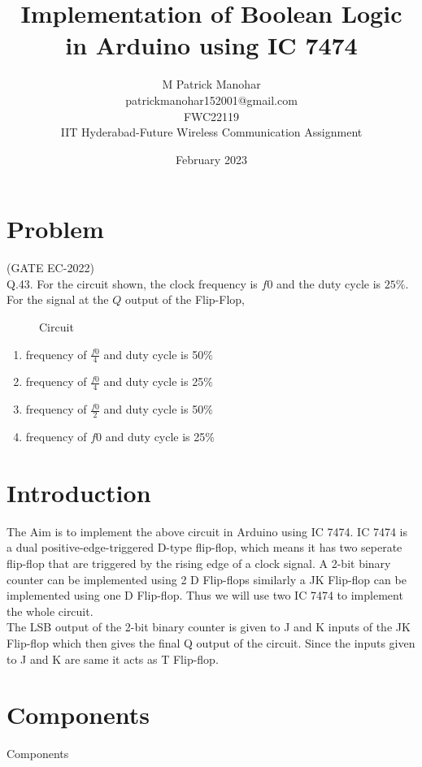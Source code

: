 \documentclass{article}
\title{Implementation of Boolean Logic in Arduino using IC 7474}
\date{February 2023}
\author{M Patrick Manohar\\patrickmanohar152001@gmail.com\\FWC22119\\IIT Hyderabad-Future Wireless Communication Assignment}
\begin{document}
\maketitle
	\tableofcontents

\pagebreak
\section{Problem}
	(GATE EC-2022)\\
	Q.43. For the circuit shown, the clock frequency is $f0$ and the duty cycle is $25 \%$. For the signal at the $Q$ output of the Flip-Flop,
\\
	\begin{figure}[h]
		\centering
	
		\caption{Circuit}
		\label{fig:1}
	\end{figure}

\begin{enumerate}
	\item frequency of $\frac{f0}{4}$ and duty cycle is 50$\%$
	\item frequency of $\frac{f0}{4}$ and duty cycle is 25$\%$
	\item frequency of $\frac{f0}{2}$ and duty cycle is 50$\%$
	\item frequency of $f0$ and duty cycle is 25$\%$ \\
\end{enumerate}

\section{Introduction}
		The Aim is to implement the above circuit in Arduino using IC 7474. IC 7474 is a dual positive-edge-triggered D-type flip-flop, which means it has two seperate flip-flop that are triggered by the rising edge of a clock signal. A 2-bit binary counter can be implemented using 2 D Flip-flops similarly a JK Flip-flop can be implemented using one D Flip-flop. Thus we will use two IC 7474 to implement the whole circuit.\\

		The LSB output of the 2-bit binary counter is given to J and K inputs of the JK Flip-flop which then gives the final Q output of the circuit. Since the inputs given to J and K are same it acts as T Flip-flop.\\
\section{Components}
	\begin{table}[h]
		\begin{center}
			
			\caption{Components}
			\label{table:0}
		\end{center}
	\end{table}
\pagebreak
\end{document}

